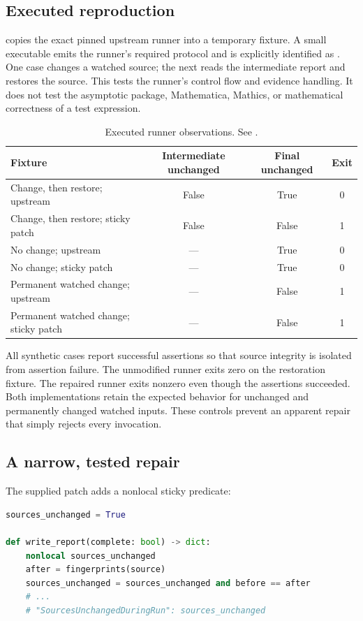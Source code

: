 \documentclass[11pt,letterpaper]{article}
\newcommand{\code}[1]{\texttt{\detokenize{#1}}}
\begin{document}
\subsection{Executed reproduction}

 copies the exact pinned upstream runner into a temporary fixture. A small executable emits the runner's required protocol and is explicitly identified as \code{PROTOCOL-ONLY-FAKE-KERNEL}. One case changes a watched source; the next reads the intermediate report and restores the source. This tests the runner's control flow and evidence handling. It does not test the asymptotic package, Mathematica, Mathics, or mathematical correctness of a test expression.

\begin{table}[htbp]
\centering\small
\begin{tabular}{P{.42\linewidth}ccc}
\toprule
Fixture & Intermediate unchanged & Final unchanged & Exit \\
\midrule
Change, then restore; upstream & False & True & 0 \\
Change, then restore; sticky patch & False & False & 1 \\
No change; upstream & --- & True & 0 \\
No change; sticky patch & --- & True & 0 \\
Permanent watched change; upstream & --- & False & 1 \\
Permanent watched change; sticky patch & --- & False & 1 \\
\bottomrule
\end{tabular}
\caption{Executed runner observations. See \protect{}.}
\end{table}

All synthetic cases report successful assertions so that source integrity is isolated from assertion failure. The unmodified runner exits zero on the restoration fixture. The repaired runner exits nonzero even though the assertions succeeded. Both implementations retain the expected behavior for unchanged and permanently changed watched inputs. These controls prevent an apparent repair that simply rejects every invocation.

\subsection{A narrow, tested repair}

The supplied patch adds a nonlocal sticky predicate:
\begin{lstlisting}[language=Python]
sources_unchanged = True

def write_report(complete: bool) -> dict:
    nonlocal sources_unchanged
    after = fingerprints(source)
    sources_unchanged = sources_unchanged and before == after
    # ...
    # "SourcesUnchangedDuringRun": sources_unchanged
\end{lstlisting}
\end{document}
